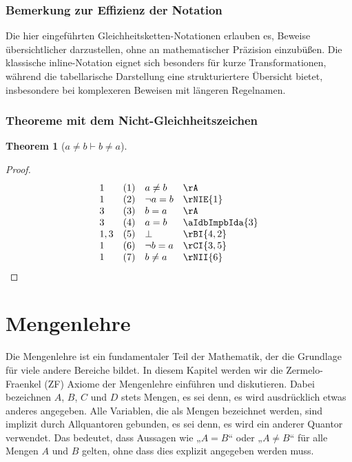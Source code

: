 \documentclass{book}
\theoremstyle{plain}
\newtheorem{theorem}{Theorem}
\theoremstyle{remark}
\theoremstyle{definition}
\begin{document}
\subsection*{Bemerkung zur Effizienz der Notation}

Die hier eingeführten Gleichheitsketten-Notationen erlauben es, Beweise übersichtlicher darzustellen, ohne an mathematischer Präzision einzubüßen. Die klassische inline-Notation eignet sich besonders für kurze Transformationen, während die tabellarische Darstellung eine strukturiertere Übersicht bietet, insbesondere bei komplexeren Beweisen mit längeren Regelnamen.


\subsection{Theoreme mit dem Nicht-Gleichheitszeichen}

\label{aNotEqualsbImpbNotEqualsa}
\begin{theorem}[\(a\neq b\vdash b\neq a\)]
\end{theorem}
\begin{proof}
	\[
	\begin{array}{llll}
		1 & (1) & a\neq b & \rA \\
		1 & (2) & \neg a=b & \rNIE{1} \\
            3 & (3) & b=a & \rA \\
            3 & (4) & a=b & \aIdbImpbIda{3} \\
            1,3 & (5) & \bot & \rBI{4,2} \\
            1 & (6) & \neg b=a & \rCI{3,5} \\
            1 & (7) & b\neq a & \rNII{6} \\
	\end{array}
	\]
\end{proof}

\chapter{Mengenlehre}

Die Mengenlehre ist ein fundamentaler Teil der Mathematik, der die Grundlage für viele andere Bereiche bildet. In diesem Kapitel werden wir die Zermelo-Fraenkel (ZF) Axiome der Mengenlehre einführen und diskutieren. Dabei bezeichnen \( A \), \( B \), \( C \) und \( D \) stets Mengen, es sei denn, es wird ausdrücklich etwas anderes angegeben. Alle Variablen, die als Mengen bezeichnet werden, sind implizit durch Allquantoren gebunden, es sei denn, es wird ein anderer Quantor verwendet. Das bedeutet, dass Aussagen wie „\( A = B \)“ oder „\( A \neq B \)“ für alle Mengen \( A \) und \( B \) gelten, ohne dass dies explizit angegeben werden muss.
\end{document}
